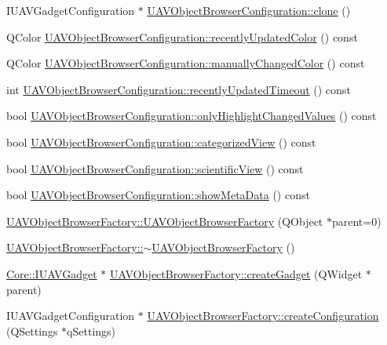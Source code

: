 \begin{DoxyCompactItemize}
\item 
\-I\-U\-A\-V\-Gadget\-Configuration $\ast$ \hyperlink{group___u_a_v_object_browser_plugin_ga0bf31a4c146a973fe414471258c40b9a}{\-U\-A\-V\-Object\-Browser\-Configuration\-::clone} ()
\item 
\-Q\-Color \hyperlink{group___u_a_v_object_browser_plugin_gabd9e62445c6dafe38aff2aa05e0b63e0}{\-U\-A\-V\-Object\-Browser\-Configuration\-::recently\-Updated\-Color} () const 
\item 
\-Q\-Color \hyperlink{group___u_a_v_object_browser_plugin_ga3c96e42ba99892a40daa0e4140285ccd}{\-U\-A\-V\-Object\-Browser\-Configuration\-::manually\-Changed\-Color} () const 
\item 
int \hyperlink{group___u_a_v_object_browser_plugin_ga3aabfce2aedab253f923829311c4e07d}{\-U\-A\-V\-Object\-Browser\-Configuration\-::recently\-Updated\-Timeout} () const 
\item 
bool \hyperlink{group___u_a_v_object_browser_plugin_gafaf541f03652cd6f57909b0e8c453695}{\-U\-A\-V\-Object\-Browser\-Configuration\-::only\-Highlight\-Changed\-Values} () const 
\item 
bool \hyperlink{group___u_a_v_object_browser_plugin_gadc4b65d3776b63289a8e2981af3d218b}{\-U\-A\-V\-Object\-Browser\-Configuration\-::categorized\-View} () const 
\item 
bool \hyperlink{group___u_a_v_object_browser_plugin_ga70ab8d21181971d5e78925921d9ce52c}{\-U\-A\-V\-Object\-Browser\-Configuration\-::scientific\-View} () const 
\item 
bool \hyperlink{group___u_a_v_object_browser_plugin_ga02fed63cf79eb853363190d6db4139c7}{\-U\-A\-V\-Object\-Browser\-Configuration\-::show\-Meta\-Data} () const 
\item 
\hyperlink{group___u_a_v_object_browser_plugin_gaff1c7d505f0ee15281d551b8b3dce992}{\-U\-A\-V\-Object\-Browser\-Factory\-::\-U\-A\-V\-Object\-Browser\-Factory} (\-Q\-Object $\ast$parent=0)
\item 
\hyperlink{group___u_a_v_object_browser_plugin_ga54b418760329382fb643d6426b98f364}{\-U\-A\-V\-Object\-Browser\-Factory\-::$\sim$\-U\-A\-V\-Object\-Browser\-Factory} ()
\item 
\hyperlink{class_core_1_1_i_u_a_v_gadget}{\-Core\-::\-I\-U\-A\-V\-Gadget} $\ast$ \hyperlink{group___u_a_v_object_browser_plugin_gaed204f2a2b245f42bb13ed08a9ea5e24}{\-U\-A\-V\-Object\-Browser\-Factory\-::create\-Gadget} (\-Q\-Widget $\ast$parent)
\item 
\-I\-U\-A\-V\-Gadget\-Configuration $\ast$ \hyperlink{group___u_a_v_object_browser_plugin_gadb16c3cd6a17fd14fe487542e0905a47}{\-U\-A\-V\-Object\-Browser\-Factory\-::create\-Configuration} (\-Q\-Settings $\ast$q\-Settings)

\end{DoxyCompactItemize}
